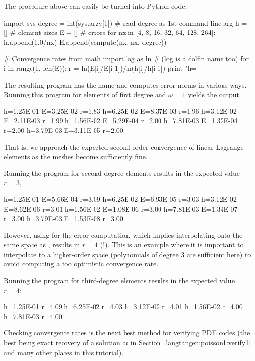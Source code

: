 The procedure above can easily be turned into Python code:
\begin{python}
import sys
degree = int(sys.argv[1])  # read degree as 1st command-line arg
h = []  # element sizes
E = []  # errors
for nx in [4, 8, 16, 32, 64, 128, 264]:
    h.append(1.0/nx)
    E.append(compute(nx, nx, degree))

# Convergence rates
from math import log as ln  # (log is a dolfin name too)
for i in range(1, len(E)):
    r = ln(E[i]/E[i-1])/ln(h[i]/h[i-1])
    print "h=%
\end{python}
The resulting program has the name  and computes
error norms in various ways. Running this program for elements of first
degree and $\omega=1$ yields the output
\begin{progoutput}
h=1.25E-01 E=3.25E-02 r=1.83
h=6.25E-02 E=8.37E-03 r=1.96
h=3.12E-02 E=2.11E-03 r=1.99
h=1.56E-02 E=5.29E-04 r=2.00
h=7.81E-03 E=1.32E-04 r=2.00
h=3.79E-03 E=3.11E-05 r=2.00
\end{progoutput}
\noindent
That is, we approach the expected second-order convergence of linear
Lagrange elements as the meshes become sufficiently fine.

\clearpage

Running the program for second-degree elements results in the expected
value $r=3$,
\begin{progoutput}
h=1.25E-01 E=5.66E-04 r=3.09
h=6.25E-02 E=6.93E-05 r=3.03
h=3.12E-02 E=8.62E-06 r=3.01
h=1.56E-02 E=1.08E-06 r=3.00
h=7.81E-03 E=1.34E-07 r=3.00
h=3.79E-03 E=1.53E-08 r=3.00
\end{progoutput}
\noindent
However, using  for the error computation, which
implies interpolating  onto the same space as ,
results in $r=4$ (!). This is an example where it is important to
interpolate  to a higher-order space (polynomials of
degree 3 are sufficient here) to avoid computing a too optimistic
convergence rate.

Running the program for third-degree elements results in the expected
value~$r=4$:
\begin{progoutput}
h=1.25E-01 r=4.09
h=6.25E-02 r=4.03
h=3.12E-02 r=4.01
h=1.56E-02 r=4.00
h=7.81E-03 r=4.00
\end{progoutput}
\noindent
Checking convergence rates is the next best method for verifying
PDE codes (the best being exact recovery of a solution as in
Section~\ref{langtangen:poisson1:verify1} and many other places in
this tutorial).


